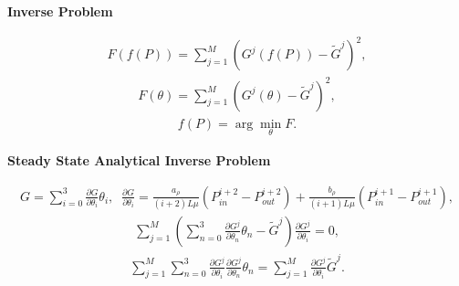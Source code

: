 \documentclass[a4paper,12pt]{extreport}
\begin{document}
\begin{multicols}{2}
        \columnbreak

        \begin{center}
        {\large \textbf{Inverse Problem}}
        \end{center}
        \begin{eqnarray}
            \label{eq:functional}
            F\left(f\left(P\right)\right) =\sum_{j=1}^M \left(G^j\left(f\left(P\right)\right) - \tilde{G}^j\right)^2,
        \end{eqnarray}
        \begin{eqnarray}
            \label{eq:functional_parameters}
            F\left(\theta\right) =\sum_{j=1}^M \left(G^j\left(\theta\right) - \tilde{G}^j\right)^2,
        \end{eqnarray}
        \begin{eqnarray}
            \label{eq:minimization_functional_parameters}
            f(P) = \arg  \min_{\theta}  F.
        \end{eqnarray}

    \end{multicols}

    \begin{center}
    {\large \textbf{Steady State Analytical Inverse Problem}}
    \end{center}
    \begin{eqnarray}
        \label{eq:consumption_poisson_diff_particular_d}
        G = \sum \limits_{i=0}^{3} \frac{\partial G}{\partial \theta_i}\theta_i, \;\;
        \frac{\partial G}{\partial \theta_{i}} =
        \frac{a_{\rho}}{\left(i+2\right) L\mu} \left(P_{in}^{i+2} -P_{out}^{i+2} \right)+
        \frac{b_{\rho}}{\left(i+1\right)L\mu} \left(P_{in}^{i+1} -P_{out}^{i+1} \right),
    \end{eqnarray}
    \begin{eqnarray}
        \label{eq:least_squares_analytical_1}
        \sum_{j=1}^M \left(\sum_{n=0}^{3} \frac{\partial G^j}{\partial \theta_n}\theta_n - \tilde{G}^j\right)\frac{\partial G^j}{\partial \theta_i} = 0,
    \end{eqnarray}
    \begin{eqnarray}
        \label{eq:least_squares_analytical_2}
        \sum_{j=1}^M \sum_{n=0}^{3} \frac{\partial G^j}{\partial \theta_i} \frac{\partial G^j}{\partial \theta_n}\theta_n =\sum_{j=1}^M \frac{\partial G^j}{\partial \theta_i} \tilde{G}^j.
    \end{eqnarray}
\end{document}
